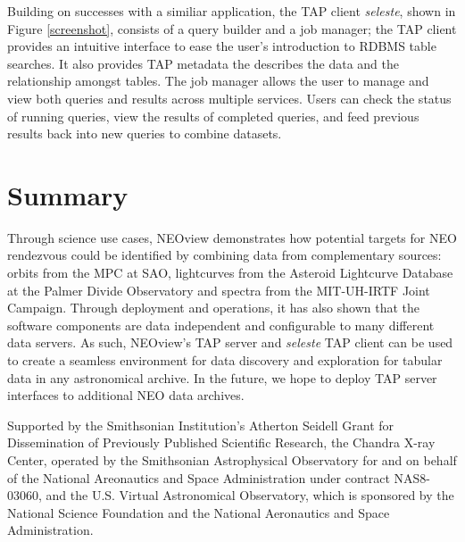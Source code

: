 \documentclass[11pt,twoside]{article}
\begin{document}
Building on successes with a similiar application\citep{cscview}, the TAP client \textit{seleste}, shown in Figure \ref{screenshot}, consists of a query builder and a job manager; the TAP client provides an intuitive interface to ease the user's introduction to RDBMS table searches.  It also provides TAP metadata the describes the data and the relationship amongst tables.  The job manager allows the user to manage and view both queries and results across multiple services.  Users can check the status of running queries, view the results of completed queries, and feed previous results back into new queries to combine datasets. 


\section{Summary}
Through science use cases, NEOview demonstrates how potential targets for NEO rendezvous could be identified by combining data from complementary sources: orbits from the MPC at SAO, lightcurves from the Asteroid Lightcurve Database at the Palmer Divide Observatory and spectra from the MIT-UH-IRTF Joint Campaign. Through deployment and operations, it has also shown that the software components are data independent and configurable to many different data servers. As such, NEOview's TAP server and \textit{seleste} TAP client can be used to create a seamless environment for data discovery and exploration for tabular data in any astronomical archive.  In the future, we hope to deploy TAP server interfaces to additional NEO data archives.

\acknowledgements Supported by the Smithsonian Institution's Atherton Seidell Grant for Dissemination of Previously Published Scientific Research, the Chandra X-ray Center, operated by the Smithsonian Astrophysical Observatory for and on behalf of the National Areonautics and Space Administration under contract NAS8-03060, and the U.S. Virtual Astronomical Observatory, which is sponsored by the National Science Foundation and the National Aeronautics and Space Administration.



\end{document}
